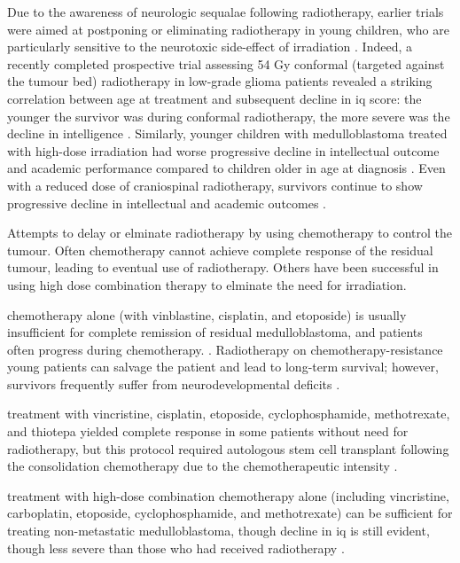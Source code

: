 Due to the awareness of neurologic sequalae following radiotherapy, earlier trials were aimed at postponing or eliminating radiotherapy in young children, who are particularly sensitive to the neurotoxic side-effect of irradiation . Indeed, a recently completed prospective trial assessing 54 Gy conformal (targeted against the tumour bed) radiotherapy in low-grade glioma patients revealed a striking correlation between age at treatment and subsequent decline in \gls{iq} score: the younger the survivor was during conformal radiotherapy, the more severe was the decline in intelligence . Similarly, younger children with medulloblastoma treated with high-dose irradiation had worse progressive decline in intellectual outcome and academic performance compared to children older in age at diagnosis . Even with a reduced dose of craniospinal radiotherapy, survivors continue to show progressive decline in intellectual and academic outcomes .

Attempts to delay or elminate radiotherapy by using chemotherapy to control the tumour. Often chemotherapy cannot achieve complete response of the residual tumour, leading to eventual use of radiotherapy. Others have been successful in using high dose combination therapy to elminate the need for irradiation.

chemotherapy alone (with vinblastine, cisplatin, and etoposide) is usually insufficient for complete remission of residual medulloblastoma, and patients often progress during chemotherapy. . Radiotherapy on chemotherapy-resistance young patients can salvage the patient and lead to long-term survival; however, survivors frequently suffer from neurodevelopmental deficits .

treatment with vincristine, cisplatin, etoposide, cyclophosphamide, methotrexate, and thiotepa yielded complete response in some patients without need for radiotherapy, but this protocol required autologous stem cell transplant following the consolidation chemotherapy due to the chemotherapeutic intensity .

treatment with high-dose combination chemotherapy alone (including vincristine, carboplatin, etoposide, cyclophosphamide, and methotrexate) can be sufficient for treating non-metastatic medulloblastoma, though decline in \gls{iq} is still evident, though less severe than those who had received radiotherapy .

